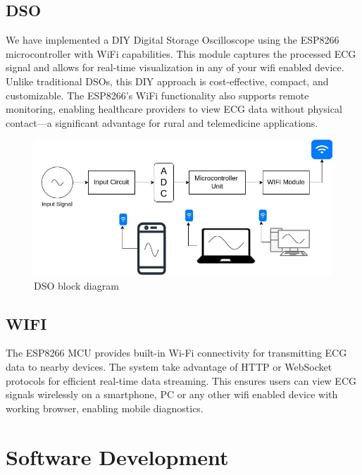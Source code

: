 \section{DSO}
We have implemented a DIY Digital Storage Oscilloscope using the ESP8266\cite{Espressif2015} microcontroller with WiFi capabilities. This module captures the processed ECG signal and allows for real-time visualization in any of your wifi enabled device. Unlike traditional DSOs, this DIY approach is cost-effective, compact, and customizable. The ESP8266’s WiFi functionality also supports remote monitoring, enabling healthcare providers to view ECG data without physical contact—a significant advantage for rural and telemedicine applications.

\begin{figure}[H]
    \centering
    \includegraphics[scale=0.5]{images/dso_block_diagram.jpg}
    \caption{DSO block diagram}
    \label{fig:dso_block_diagram}
\end{figure}

\section{WIFI}
The ESP8266\cite{Espressif2015} MCU provides built-in Wi-Fi connectivity for transmitting ECG data to nearby devices. The system take advantage of HTTP or WebSocket protocols for efficient real-time data streaming. This ensures users can view ECG signals wirelessly on a smartphone, PC or any other wifi enabled device with working browser, enabling mobile diagnostics.




\chapter{Software Development}

